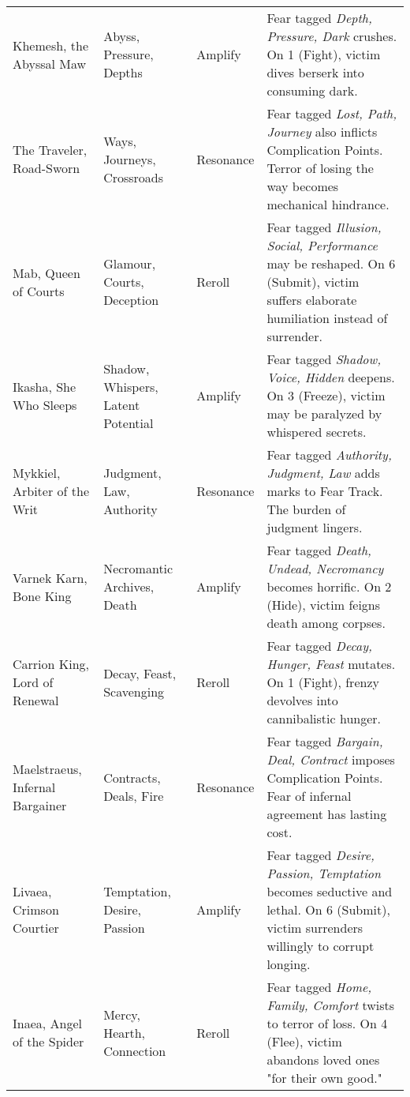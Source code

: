\begin{longtable}{@{}p{3.2cm}p{4.5cm}p{2.8cm}p{5.9cm}@{}}
Khemesh, the Abyssal Maw & Abyss, Pressure, Depths & Amplify & 
Fear tagged \emph{Depth, Pressure, Dark} crushes. On 1 (Fight), victim dives berserk into consuming dark. \\

The Traveler, Road-Sworn & Ways, Journeys, Crossroads & Resonance & 
Fear tagged \emph{Lost, Path, Journey} also inflicts Complication Points. Terror of losing the way becomes mechanical hindrance. \\

Mab, Queen of Courts & Glamour, Courts, Deception & Reroll & 
Fear tagged \emph{Illusion, Social, Performance} may be reshaped. On 6 (Submit), victim suffers elaborate humiliation instead of surrender. \\

Ikasha, She Who Sleeps & Shadow, Whispers, Latent Potential & Amplify & 
Fear tagged \emph{Shadow, Voice, Hidden} deepens. On 3 (Freeze), victim may be paralyzed by whispered secrets. \\

Mykkiel, Arbiter of the Writ & Judgment, Law, Authority & Resonance & 
Fear tagged \emph{Authority, Judgment, Law} adds marks to Fear Track. The burden of judgment lingers. \\

Varnek Karn, Bone King & Necromantic Archives, Death & Amplify & 
Fear tagged \emph{Death, Undead, Necromancy} becomes horrific. On 2 (Hide), victim feigns death among corpses. \\

Carrion King, Lord of Renewal & Decay, Feast, Scavenging & Reroll & 
Fear tagged \emph{Decay, Hunger, Feast} mutates. On 1 (Fight), frenzy devolves into cannibalistic hunger. \\

Maelstraeus, Infernal Bargainer & Contracts, Deals, Fire & Resonance & 
Fear tagged \emph{Bargain, Deal, Contract} imposes Complication Points. Fear of infernal agreement has lasting cost. \\

Livaea, Crimson Courtier & Temptation, Desire, Passion & Amplify & 
Fear tagged \emph{Desire, Passion, Temptation} becomes seductive and lethal. On 6 (Submit), victim surrenders willingly to corrupt longing. \\

Inaea, Angel of the Spider & Mercy, Hearth, Connection & Reroll & 
Fear tagged \emph{Home, Family, Comfort} twists to terror of loss. On 4 (Flee), victim abandons loved ones "for their own good." \\


\end{longtable}
